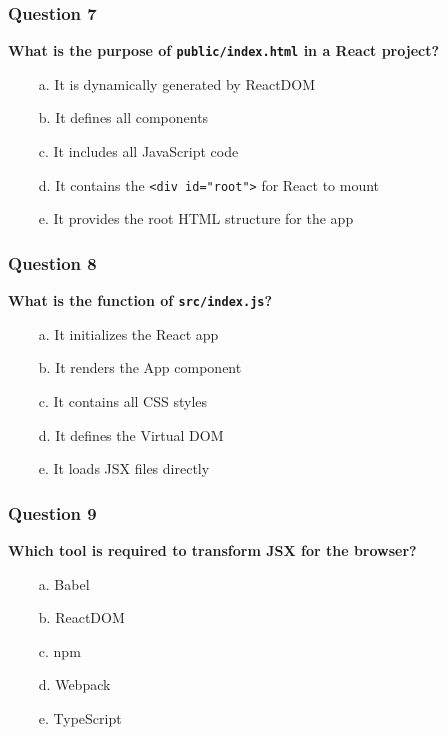 \documentclass{article}
\newcommand{\cmark}{\textcolor{green}{\ding{51}}} %
\newcommand{\xmark}{\textcolor{red}{\ding{55}}}   %
\begin{document}
\subsubsection*{Question 7}
\textbf{What is the purpose of \texttt{public/index.html} in a React project?}

\begin{itemize}
  \item[\xmark\ a.] It is dynamically generated by ReactDOM
  \item[\xmark\ b.] It defines all components
  \item[\xmark\ c.] It includes all JavaScript code
  \item[\cmark\ d.] It contains the \texttt{<div id="root">} for React to mount
  \item[\cmark\ e.] It provides the root HTML structure for the app
\end{itemize}

\subsubsection*{Question 8}
\textbf{What is the function of \texttt{src/index.js}?}

\begin{itemize}
  \item[\cmark\ a.] It initializes the React app
  \item[\cmark\ b.] It renders the App component
  \item[\xmark\ c.] It contains all CSS styles
  \item[\xmark\ d.] It defines the Virtual DOM
  \item[\xmark\ e.] It loads JSX files directly
\end{itemize}

\subsubsection*{Question 9}
\textbf{Which tool is required to transform JSX for the browser?}

\begin{itemize}
  \item[\cmark\ a.] Babel
  \item[\xmark\ b.] ReactDOM
  \item[\xmark\ c.] npm
  \item[\xmark\ d.] Webpack
  \item[\xmark\ e.] TypeScript
\end{itemize}
\end{document}
